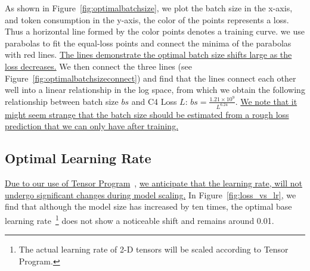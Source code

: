 As shown in Figure~\ref{fig:optimalbatchsize}, we plot the batch size in the x-axis, and token consumption in the y-axis, the color of the points represents a loss. Thus a horizontal line formed by the color points denotes a training curve. we use parabolas to fit the equal-loss points and connect the minima of the parabolas with red lines. \uline{The lines demonstrate the optimal batch size shifts large as the loss decreases.} We then connect the three lines (see Figure~\ref{fig:optimalbatchsizeconnect}) and find that the lines connect each other well into a linear relationship in the log space, from which we obtain the following relationship between batch size $bs$ and C4 Loss $L$: $ bs = \frac{1.21\times10^9}{L^{6.24}}$. \uline{We note that it might seem strange that the batch size should be estimated from a rough loss prediction that we can only have after training.}

\subsection{Optimal Learning Rate}
\uline{Due to our use of Tensor Program}~\citep{yang2022tensor, yang2023tensor}, \uline{we anticipate that the learning rate, will not undergo significant changes during model scaling.} In Figure~\ref{fig:loss_vs_lr}, we find that although the model size has increased by ten times, the optimal base learning rate~\footnote{The actual learning rate of 2-D tensors will be scaled according to Tensor Program.} does not show a noticeable shift and remains around 0.01.

